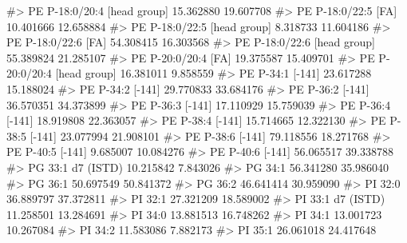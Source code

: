 \documentclass[
  letterpaper,
  DIV=11,
  numbers=noendperiod]{scrreprt}
\newenvironment{Shaded}{\begin{snugshade}}{\end{snugshade}}
\newcommand{\CommentTok}[1]{\textcolor[rgb]{0.37,0.37,0.37}{#1}}
\begin{document}
\begin{Shaded}
\begin{Highlighting}[]
\CommentTok{\#\textgreater{} PE P{-}18:0/20:4 [head group]               15.362880 19.607708}
\CommentTok{\#\textgreater{} PE P{-}18:0/22:5 [FA]                       10.401666 12.658884}
\CommentTok{\#\textgreater{} PE P{-}18:0/22:5 [head group]                8.318733 11.604186}
\CommentTok{\#\textgreater{} PE P{-}18:0/22:6 [FA]                       54.308415 16.303568}
\CommentTok{\#\textgreater{} PE P{-}18:0/22:6 [head group]               55.389824 21.285107}
\CommentTok{\#\textgreater{} PE P{-}20:0/20:4 [FA]                       19.375587 15.409701}
\CommentTok{\#\textgreater{} PE P{-}20:0/20:4 [head group]               16.381011  9.858559}
\CommentTok{\#\textgreater{} PE P{-}34:1 [{-}141]                          23.617288 15.188024}
\CommentTok{\#\textgreater{} PE P{-}34:2 [{-}141]                          29.770833 33.684176}
\CommentTok{\#\textgreater{} PE P{-}36:2 [{-}141]                          36.570351 34.373899}
\CommentTok{\#\textgreater{} PE P{-}36:3 [{-}141]                          17.110929 15.759039}
\CommentTok{\#\textgreater{} PE P{-}36:4 [{-}141]                          18.919808 22.363057}
\CommentTok{\#\textgreater{} PE P{-}38:4 [{-}141]                          15.714665 12.322130}
\CommentTok{\#\textgreater{} PE P{-}38:5 [{-}141]                          23.077994 21.908101}
\CommentTok{\#\textgreater{} PE P{-}38:6 [{-}141]                          79.118556 18.271768}
\CommentTok{\#\textgreater{} PE P{-}40:5 [{-}141]                           9.685007 10.084276}
\CommentTok{\#\textgreater{} PE P{-}40:6 [{-}141]                          56.065517 39.338788}
\CommentTok{\#\textgreater{} PG 33:1 d7 (ISTD)                         10.215842  7.843026}
\CommentTok{\#\textgreater{} PG 34:1                                   56.341280 35.986040}
\CommentTok{\#\textgreater{} PG 36:1                                   50.697549 50.841372}
\CommentTok{\#\textgreater{} PG 36:2                                   46.641414 30.959090}
\CommentTok{\#\textgreater{} PI 32:0                                   36.889797 37.372811}
\CommentTok{\#\textgreater{} PI 32:1                                   27.321209 18.589002}
\CommentTok{\#\textgreater{} PI 33:1 d7 (ISTD)                         11.258501 13.284691}
\CommentTok{\#\textgreater{} PI 34:0                                   13.881513 16.748262}
\CommentTok{\#\textgreater{} PI 34:1                                   13.001723 10.267084}
\CommentTok{\#\textgreater{} PI 34:2                                   11.583086  7.882173}
\CommentTok{\#\textgreater{} PI 35:1                                   26.061018 24.417648}

\end{Highlighting}
\end{Shaded}
\end{document}
